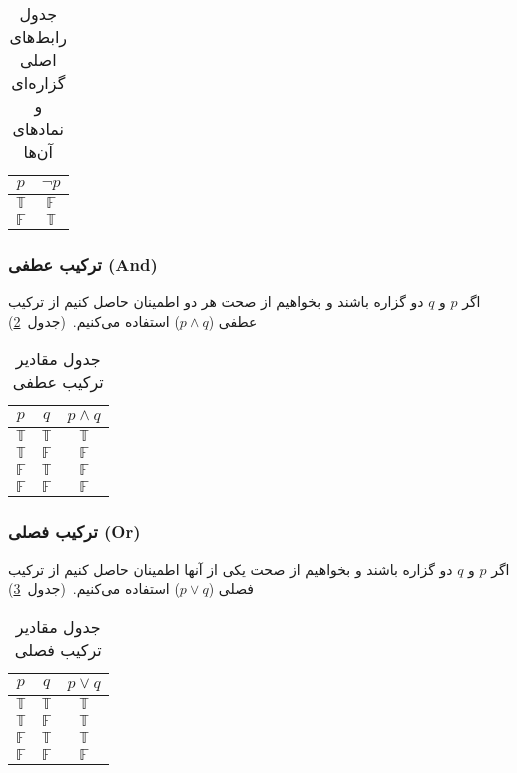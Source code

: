 \documentclass[a4paper, margin=1in]{article}
\newcommand{\T}{$\mathbb{T}$}
\newcommand{\F}{$\mathbb{F}$}
\newcommand{\reft}[1]{~(جدول~\ref{tb:#1})}
\begin{document}
\begin{table}[h]\centering
  \begin{LTR}
    \begin{tabular}{c|c}
      $p$ & $\lnot{}p$ \\
      \hline
      \T & \F\\
      \F & \T\\
    \end{tabular}
  \end{LTR}
  \caption{جدول رابط‌های اصلی گزاره‌ای و نمادهای آن‌ها}\label{tb:not}
\end{table}

\subsubsection{ترکیب عطفی (And)}
اگر $p$ و $q$ دو گزاره باشند و بخواهیم از صحت هر دو اطمینان حاصل کنیم از ترکیب عطفی ($p \land q$) استفاده می‌کنیم.\reft{and}

\begin{table}[h]\centering
  \begin{LTR}
    \begin{tabular}{c c|c}
      $p$ & $q$ & $p \land q$ \\
      \hline
      \T & \T & \T \\
      \T & \F & \F \\
      \F & \T & \F \\
      \F & \F & \F \\
    \end{tabular}
  \end{LTR}
  \caption{جدول مقادیر ترکیب عطفی}\label{tb:and}
\end{table}

\subsubsection{ترکیب فصلی (Or)}
اگر $p$ و $q$ دو گزاره باشند و بخواهیم از صحت یکی از آنها اطمینان حاصل کنیم از ترکیب فصلی ($p \lor q$) استفاده می‌کنیم.\reft{or}

\begin{table}[h]\centering
  \begin{LTR}
    \begin{tabular}{c c|c}
      $p$ & $q$ & $p \lor q$ \\
      \hline
      \T & \T & \T \\
      \T & \F & \T \\
      \F & \T & \T \\
      \F & \F & \F \\
    \end{tabular}
  \end{LTR}
  \caption{جدول مقادیر ترکیب فصلی}\label{tb:or}
\end{table}
\end{document}

